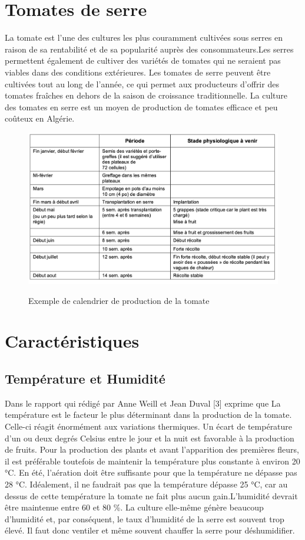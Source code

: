 \section{Tomates de serre }
La tomate est l'une des cultures les plus couramment cultivées sous serres en raison de sa rentabilité et de sa popularité auprès des consommateurs.Les serres permettent également de cultiver des variétés de tomates qui ne seraient pas viables dans des conditions extérieures. Les tomates de serre peuvent être cultivées tout au long de l'année, ce qui permet aux producteurs d'offrir des tomates fraîches en dehors de la saison de croissance traditionnelle.
La culture des tomates en serre est un moyen de production de tomates efficace et peu
coûteux en Algérie.
\begin{figure}
    \centering
    \centering
    \caption{Exemple de calendrier de production de la tomate}
	\includegraphics[width=15cm]{figures/periodetomate.png}
	\label{fig:Exemple de calendrier de production de la tomate} 
\end{figure}

\section{Caractéristiques}

\subsection{Température et Humidité}
Dans le rapport qui rédigé par Anne Weill et Jean Duval [3] exprime que 
La température est le facteur le plus déterminant dans la production de la tomate. Celle-ci
réagit énormément aux variations thermiques.
Un écart de température d’un ou deux degrés Celsius entre le jour et la nuit est favorable à
la production de fruits. Pour la production des plants et avant l’apparition des premières
fleurs, il est préférable toutefois de maintenir la température plus constante à environ
20 °C. En été, l’aération doit être suffisante pour que la température ne dépasse pas 28
°C. Idéalement, il ne faudrait pas que la température dépasse  25 °C, car au dessus de cette température la tomate ne fait plus aucun gain.L’humidité  devrait être
maintenue entre 60 et 80 \%. La culture elle-même génère beaucoup d’humidité et, par
conséquent, le taux d’humidité de la serre est souvent trop élevé. Il faut donc ventiler et
même souvent chauffer la serre pour déshumidifier.


